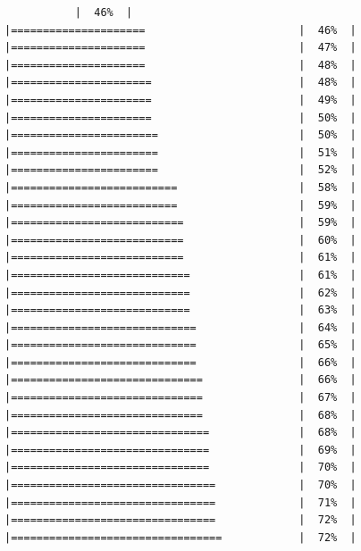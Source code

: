 \documentclass[
  krantz2]{krantz}
\begin{document}
\begin{verbatim}
           |  46%  |                                                     |=====================                        |  46%  |                                                     |=====================                        |  47%  |                                                     |=====================                        |  48%  |                                                     |======================                       |  48%  |                                                     |======================                       |  49%  |                                                     |======================                       |  50%  |                                                     |=======================                      |  50%  |                                                     |=======================                      |  51%  |                                                     |=======================                      |  52%  |                                                     |==========================                   |  58%  |                                                     |==========================                   |  59%  |                                                     |===========================                  |  59%  |                                                     |===========================                  |  60%  |                                                     |===========================                  |  61%  |                                                     |============================                 |  61%  |                                                     |============================                 |  62%  |                                                     |============================                 |  63%  |                                                     |=============================                |  64%  |                                                     |=============================                |  65%  |                                                     |=============================                |  66%  |                                                     |==============================               |  66%  |                                                     |==============================               |  67%  |                                                     |==============================               |  68%  |                                                     |===============================              |  68%  |                                                     |===============================              |  69%  |                                                     |===============================              |  70%  |                                                     |================================             |  70%  |                                                     |================================             |  71%  |                                                     |================================             |  72%  |                                                     |=================================            |  72%  |                                                     
\end{verbatim}
\end{document}
